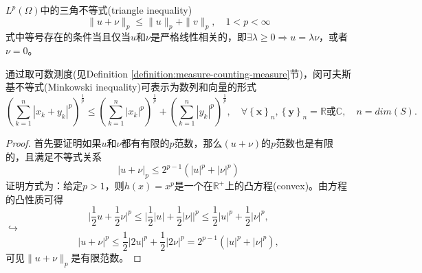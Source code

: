 \begin{definition}[三角不等式]
  \label{definition:triangle-inequality-def}
  $L^p(\Omega)$中的三角不等式(triangle inequality) 
  \begin{equation*}
  \| u + \nu \|_p \le \| u \|_p + \| v \|_p, \quad 1 < p < \infty
  \end{equation*}
式中等号存在的条件当且仅当$u$和$\nu$是严格线性相关的，即$ \exists \lambda \ge 0 \Rightarrow u = \lambda \nu$，或者$\nu = 0$。
\end{definition}

\begin{definition}[闵可夫斯基不等式]
  \label{sec:minkowski-ineq-def}
通过取可数测度(见Definition \ref{definition:measure-counting-measure}节)，闵可夫斯基不等式(Minkowski inequality)可表示为数列和向量的形式
\begin{equation*}
  \left( \sum_{k=1}^{n} | x_k + y_k | ^p \right)^{\frac{1}{p}}
  \le \left( \sum_{k=1}^{n} | x_k | ^p \right)^{\frac{1}{p}}
  + \left( \sum_{k=1}^{n} | y_k | ^p \right)^{\frac{1}{p}}, \quad \forall \left\{ \bm{x} \right\}_{n}, \left\{ \bm{y} \right\}_{n} = \mathbb{R}\text{或}\mathbb{C}, \quad n=dim(S).
\end{equation*}
\begin{proof}
首先要证明如果$u$和$\nu$都有有限的$p$范数，那么$(u+\nu)$的$p$范数也是有限的，且满足不等式关系
\begin{equation*}
  | u + \nu |_p \le 2^{p-1} \left( |u| ^{p} + |\nu| ^{p}\right)
\end{equation*}
证明方式为：给定$p>1$，则$h(x) = x^p$是一个在$\mathbb{R}^{+}$上的凸方程(convex)。由方程的凸性质可得
\begin{equation*}
  \big| \frac{1}{2} u + \frac{1}{2} \nu \big|^p
  \le \big|\frac{1}{2} |u| + \frac{1}{2} |\nu| \big|^p
  \le \frac{1}{2} |u|^p + \frac{1}{2} |\nu|^p,
\end{equation*}
$\hookrightarrow$
\begin{equation*}
  \big| u + \nu \big|^p \le \frac{1}{2} |2u|^p + \frac{1}{2} |2\nu|^p
  = 2^{p-1} \left( |u|^p + |\nu|^p \right),
\end{equation*}
可见$\|u+\nu\|_p$是有限范数。


\end{proof}
\end{definition}
